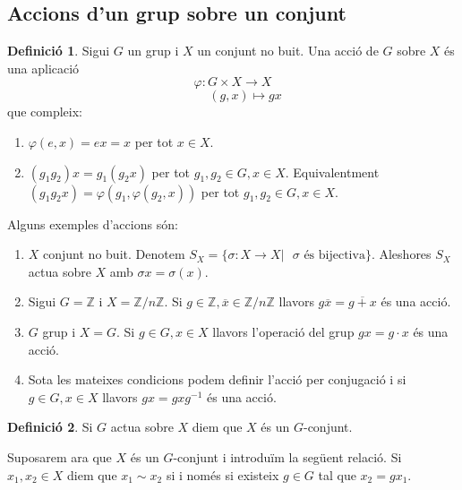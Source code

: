 \documentclass[a4paper,11pt]{report}
\newcommand{\inv}[1]{#1^{-1}}
\newcommand{\z}{\mathbb{Z}}
\newcommand{\zn}{\mathbb{Z}/n\mathbb{Z}}
\renewcommand{\bar}{\overline}
\theoremstyle{theorem}
\theoremstyle{definition}
\newtheorem{definicio}{\normalfont\sffamily\bfseries Definició}[section]
\begin{document}
\subsection{Accions d'un grup sobre un conjunt}
\begin{definicio}
	Sigui $G$ un grup i $X$ un conjunt no buit. Una acció de $G$ sobre $X$ és una aplicació $$\varphi:G\times X\longrightarrow X$$
	$$\qquad(g,x)\longmapsto gx$$ que compleix:
	\begin{enumerate}
		\item $\varphi(e,x)=ex=x$ per tot $x\in X$.
		\item $(g_1 g_2)x=g_1(g_2x)$ per tot $g_1,g_2\in G,x\in X$. Equivalentment $(g_1 g_2 x)=\varphi(g_1, \varphi(g_2,x))$ per tot $g_1, g_2\in G,x\in X$.
	\end{enumerate}
\end{definicio}
Alguns exemples d'accions són:
\begin{enumerate}
	\item $X$ conjunt no buit. Denotem $S_X=\{\sigma:X\rightarrow X|\text{ }\sigma\text{ és bijectiva}\}$. Aleshores $S_{X}$ actua sobre $X$ amb $\sigma x=\sigma (x)$.
	\item Sigui $G=\mathbb{Z}$ i $X=\zn$. Si $g\in\z,\bar{x}\in\zn$ llavors $g\bar{x}=\bar{g+x}$ és una acció.
	\item $G$ grup i $X=G$. Si $g\in G,x\in X$ llavors l'operació del grup  $gx=g\cdot x$ és una acció.
	\item Sota les mateixes condicions podem definir l'acció per conjugació i si $g\in G,x\in X$ llavors $gx=gx\inv{g}$ és una acció.
\end{enumerate}
\begin{definicio}
	Si $G$ actua sobre $X$ diem que $X$ és un $G$-conjunt.
\end{definicio}
Suposarem ara que $X$ és un $G$-conjunt i introduïm la següent relació.
	Si $x_1,x_2\in X$ diem que $x_1\sim x_2$ si i només si existeix $g\in G$ tal que $x_2=g x_1$.
\end{document}
